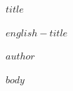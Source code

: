 \documentclass[11pt,a4paper]{ctexart}
\begin{document}
\thispagestyle{empty}
\begin{center}
  \vspace*{-0.65\baselineskip}
  {\bfseries\fontsize{16.2}{20.5}\selectfont $title$\par}
  \vspace{0.42\baselineskip}
  {\fontsize{10.5}{13}\selectfont\itshape $english-title$\par}
  \vspace{0.50\baselineskip}
  {$author$\par}
\end{center}
\vspace{0.10\baselineskip}

$body$
\end{document}

